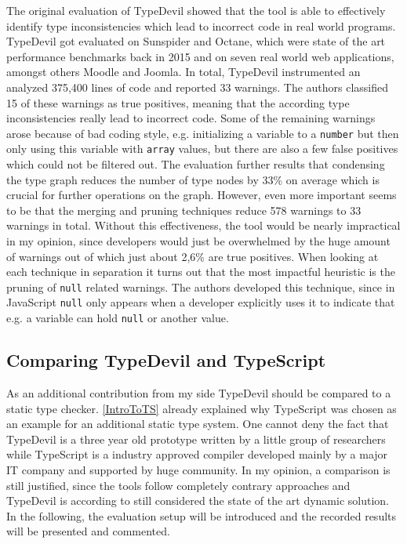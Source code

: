 \documentclass[runningheads,a4paper]{llncs}
\begin{document}
The original evaluation of TypeDevil showed that the tool is able to effectively identify type inconsistencies which lead to incorrect code in real world programs.
TypeDevil got evaluated on Sunspider and Octane, which were state of the art performance benchmarks back in 2015 and on seven real world web applications, amongst others Moodle and Joomla.
In total, TypeDevil instrumented an analyzed 375,400 lines of code and reported 33 warnings.
The authors classified 15 of these warnings as true positives, meaning that the according type inconsistencies really lead to incorrect code.
Some of the remaining warnings arose because of bad coding style, e.g. initializing a variable to a \lstinline[columns=fixed]{number} but then only using this variable with \lstinline[columns=fixed]{array} values, but there are also a few false positives which could not be filtered out.
The evaluation further results that condensing the type graph reduces the number of type nodes by 33\% on average which is crucial for further operations on the graph.
However, even more important seems to be that the merging and pruning techniques reduce 578 warnings to 33 warnings in total.
Without this effectiveness, the tool would be nearly impractical in my opinion, since developers would just be overwhelmed by the huge amount of warnings out of which just about 2,6\% are true positives. 
When looking at each technique in separation it turns out that the most impactful heuristic is the pruning of \lstinline[columns=fixed]{null} related warnings. 
The authors developed this technique, since in JavaScript \lstinline[columns=fixed]{null} only appears when a developer explicitly uses it to indicate that e.g. a variable can hold \lstinline[columns=fixed]{null} or another value.

\subsection{Comparing TypeDevil and TypeScript} \label{comparison}
As an additional contribution from my side TypeDevil should be compared to a static type checker.
\ref{IntroToTS} already explained why TypeScript was chosen as an example for an additional static type system.
One cannot deny the fact that TypeDevil is a three year old prototype written by a little group of researchers while TypeScript is a industry approved compiler developed mainly by a major IT company and supported by huge community.
In my opinion, a comparison is still justified, since the tools follow completely contrary approaches and TypeDevil is according to \cite{DBLP:conf/icse/TanXCLYS17} still considered the state of the art dynamic solution.
In the following, the evaluation setup will be introduced and the recorded results will be presented and commented. 
\end{document}
